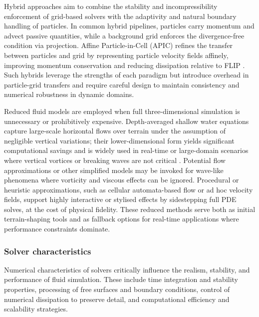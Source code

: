 Hybrid approaches aim to combine the stability and incompressibility enforcement of grid-based solvers with the adaptivity and natural boundary handling of particles. In common hybrid pipelines, particles carry momentum and advect passive quantities, while a background grid enforces the divergence-free condition via projection. Affine Particle-in-Cell (APIC) refines the transfer between particles and grid by representing particle velocity fields affinely, improving momentum conservation and reducing dissipation relative to FLIP \cite{Jiang2015}. Such hybrids leverage the strengths of each paradigm but introduce overhead in particle-grid transfers and require careful design to maintain consistency and numerical robustness in dynamic domains.

Reduced fluid models are employed when full three-dimensional simulation is unnecessary or prohibitively expensive. Depth-averaged shallow water equations capture large-scale horizontal flows over terrain under the assumption of negligible vertical variations; their lower-dimensional form yields significant computational savings and is widely used in real-time or large-domain scenarios where vertical vortices or breaking waves are not critical \cite{Vreugdenhil1994,Pan2012}. Potential flow approximations or other simplified models may be invoked for wave-like phenomena where vorticity and viscous effects can be ignored. Procedural or heuristic approximations, such as cellular automata-based flow or ad hoc velocity fields, support highly interactive or stylised effects by sidestepping full PDE solves, at the cost of physical fidelity. These reduced methods serve both as initial terrain-shaping tools and as fallback options for real-time applications where performance constraints dominate.

\subsubsection{Solver characteristics}

Numerical characteristics of solvers critically influence the realism, stability, and performance of fluid simulation. These include time integration and stability properties, processing of free surfaces and boundary conditions, control of numerical dissipation to preserve detail, and computational efficiency and scalability strategies.

